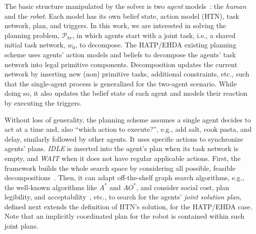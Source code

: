 \documentclass[letterpaper]{article} %
\begin{document}
The basic structure manipulated by the solver is two \textit{agent} models~\cite{thesisBuisan21}: the \textit{human} and the \textit{robot}. 
Each model has its own belief state, action model (HTN), task network, plan, and triggers. In this work, we are interested in solving the planning problem, $\mathcal{P}_{hr}$, in which agents start with a joint task, i.e., a shared initial task network, $w_0$, to decompose.
The HATP/EHDA existing planning scheme uses agents' action models and beliefs to decompose the agents' task network into legal primitive components. 
Decomposition updates the current network by inserting new (non) primitive tasks, additional constraints, etc., such that the single-agent process is generalized for the two-agent scenario.
While doing so, it also updates the belief state of each agent and models their reaction by executing the triggers.

Without loss of generality, the planning scheme assumes a single agent decides to act at a time and, also ``which action to execute?'', e.g., add salt, cook pasta, and delay, similarly followed by other agents. 
It uses specific actions to synchronize agents' plans. {\em IDLE} is inserted into the agent's plan when its task network is empty, and {\em WAIT} when it does not have regular applicable actions. First, the framework builds the whole search space by considering all possible, feasible decompositions~\cite{buisan:hal-03684211}. 
Then, it can adapt off-the-shelf graph search algorithms, e.g., the well-known algorithms like $A^*$ and $AO^*$, and consider social cost, plan legibility, and acceptability~\cite{alili2009task}, etc., to search for the agents' \textit{joint solution plan}, defined next extends the definition of HTN's solution, for the HATP/EHDA case. 
Note that an implicitly coordinated plan for the robot is contained within such joint plans. 
\end{document}
